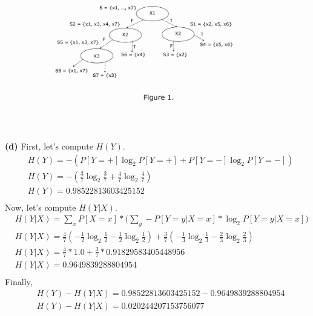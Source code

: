 \documentclass[leqno]{article}
\begin{document}
\begin{figure}[h!]
\includegraphics[width=\textwidth]{tree}  
\end{figure}

\hfill

\noindent \textbf{(d)} First, let's compute $H(Y)$. 
\begin{equation*}
\begin{split}
&H(Y) = -(P[Y = +]\log_2P[Y = +] + P[Y = -]\log_2P[Y = -]) \\
&H(Y) = -(\frac{3}{7}\log_2\frac{3}{7} + \frac{4}{7}\log_2\frac{4}{7}) \\
&H(Y) = 0.98522813603425152 \\
\end{split}
\end{equation*} 
Now, let's compute $H(Y|X)$.
\begin{equation*}
\begin{split}
&H(Y|X) = \sum_xP[X = x] * \Big(\sum_y-P[Y = y| X = x]*\log_2P[Y = y| X = x]\Big) \\
&H(Y|X) = \frac{4}{7}(-\frac{1}{2}\log_2\frac{1}{2} - \frac{1}{2}\log_2\frac{1}{2}) + \frac{3}{7}(-\frac{1}{3}\log_2\frac{1}{3} - \frac{2}{3}\log_2\frac{2}{3})\\
&H(Y|X) = \frac{4}{7}*1.0 + \frac{3}{7}* 0.91829583405448956\\
&H(Y|X) = 0.9649839288804954\\
\end{split}
\end{equation*} 
Finally,
\begin{equation*}
\begin{split}
&H(Y) - H(Y|X) = 0.98522813603425152 - 0.9649839288804954 \\
&H(Y) - H(Y|X) = 0.020244207153756077
\end{split}
\end{equation*} 
\end{document}
